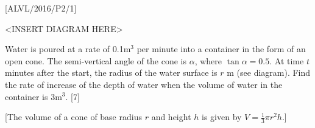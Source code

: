 \item {[}ALVL/2016/P2/1{]}
\noindent \begin{center}
\textless INSERT DIAGRAM HERE\textgreater{}
\par\end{center}

Water is poured at a rate of 0.1$\mathrm{m}^{3}$ per minute into
a container in the form of an open cone. The semi-vertical angle of
the cone is $\alpha$, where $\tan\alpha=0.5$. At time $t$ minutes
after the start, the radius of the water surface is $r$ m (see diagram).
Find the rate of increase of the depth of water when the volume of
water in the container is 3$\mathrm{m}^{3}$. \hfill{} {[}7{]}

{[}The volume of a cone of base radius $r$ and height $h$ is given
by $V=\frac{1}{3}\pi r^{2}h$.{]}
